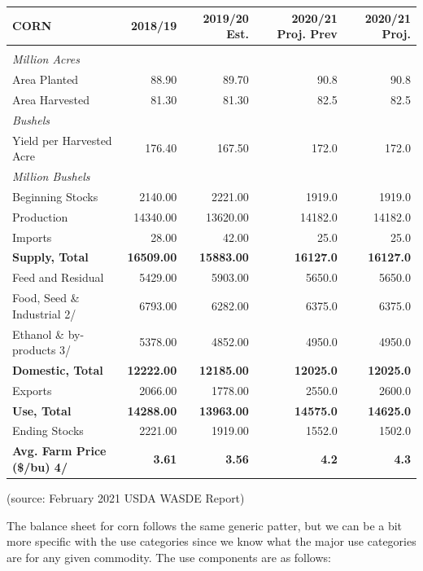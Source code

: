 \documentclass[
  letterpaper,
  DIV=11,
  numbers=noendperiod]{scrreprt}
\begin{document}
\begin{table}
\centering
\begin{tabular}{l|r|r|r|r}
\hline
CORN & 2018/19 & 2019/20 Est. & 2020/21 Proj. Prev & 2020/21 Proj.\\
\hline
 &  &  &  & \\
\hline
\em{Million Acres} & \em{} & \em{} & \em{} & \em{}\\
\hline
Area Planted & 88.90 & 89.70 & 90.8 & 90.8\\
\hline
Area Harvested & 81.30 & 81.30 & 82.5 & 82.5\\
\hline
\em{Bushels} & \em{} & \em{} & \em{} & \em{}\\
\hline
Yield per Harvested Acre & 176.40 & 167.50 & 172.0 & 172.0\\
\hline
\em{Million Bushels} & \em{} & \em{} & \em{} & \em{}\\
\hline
Beginning Stocks & 2140.00 & 2221.00 & 1919.0 & 1919.0\\
\hline
Production & 14340.00 & 13620.00 & 14182.0 & 14182.0\\
\hline
Imports & 28.00 & 42.00 & 25.0 & 25.0\\
\hline
\textbf{Supply, Total} & \textbf{16509.00} & \textbf{15883.00} & \textbf{16127.0} & \textbf{16127.0}\\
\hline
Feed and Residual & 5429.00 & 5903.00 & 5650.0 & 5650.0\\
\hline
Food, Seed \& Industrial 2/ & 6793.00 & 6282.00 & 6375.0 & 6375.0\\
\hline
Ethanol \& by-products 3/ & 5378.00 & 4852.00 & 4950.0 & 4950.0\\
\hline
\textbf{Domestic, Total} & \textbf{12222.00} & \textbf{12185.00} & \textbf{12025.0} & \textbf{12025.0}\\
\hline
Exports & 2066.00 & 1778.00 & 2550.0 & 2600.0\\
\hline
\textbf{Use, Total} & \textbf{14288.00} & \textbf{13963.00} & \textbf{14575.0} & \textbf{14625.0}\\
\hline
Ending Stocks & 2221.00 & 1919.00 & 1552.0 & 1502.0\\
\hline
\textbf{Avg. Farm Price (\$/bu)  4/} & \textbf{3.61} & \textbf{3.56} & \textbf{4.2} & \textbf{4.3}\\
\hline
\end{tabular}
\end{table}

(source: February 2021 USDA WASDE Report)

The balance sheet for corn follows the same generic patter, but we can
be a bit more specific with the use categories since we know what the
major use categories are for any given commodity. The use components are
as follows:
\end{document}
